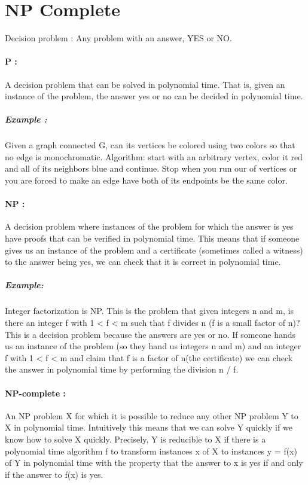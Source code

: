 \documentclass[12pt]{article}
\begin{document}
%
%
\section{NP Complete}
Decision problem :
Any problem with an answer, YES or NO.

\paragraph{P :} A decision problem that can be solved in polynomial time. That is, given an instance of the problem, the answer yes or no can be decided in polynomial time.

\subparagraph{\textit{Example : }} Given a graph connected G, can its vertices be colored using two colors so that no edge is monochromatic. Algorithm: start with an arbitrary vertex, color it red and all of its neighbors blue and continue. Stop when you run our of vertices or you are forced to make an edge have both of its endpoints be the same color.

\paragraph{NP :} A decision problem where instances of the problem for which the answer is yes have proofs that can be verified in polynomial time. This means that if someone gives us an instance of the problem and a certificate (sometimes called a witness) to the answer being yes, we can check that it is correct in polynomial time.

\subparagraph{\textit{Example:}} Integer factorization is NP. This is the problem that given integers n and m, is there an integer f with 1 < f < m such that f divides n (f is a small factor of n)? This is a decision problem because the answers are yes or no. If someone hands us an instance of the problem (so they hand us integers n and m) and an integer f with 1 < f < m and claim that f is a factor of n(the certificate) we can check the answer in polynomial time by performing the division n / f.

\paragraph{NP-complete :} An NP problem X for which it is possible to reduce any other NP problem Y to X in polynomial time. Intuitively this means that we can solve Y quickly if we know how to solve X quickly. Precisely, Y is reducible to X if there is a polynomial time algorithm f to transform instances x of X to instances y = f(x) of Y in polynomial time with the property that the answer to x is yes if and only if the answer to f(x) is yes.
\end{document}
